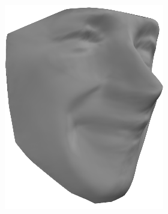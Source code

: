 \begin{figure}
\begin{subfigure}{0.23\textwidth}
        \includegraphics[width=\textwidth]{statistical_normals/images/gsfs_results/celebrities/tom_hanks_spherical.png}
\label{fig:tom-hanks-no-texture}
    \end{subfigure}
    \begin{subfigure}{0.23\textwidth}
        \centering

\end{subfigure}
\end{figure}
